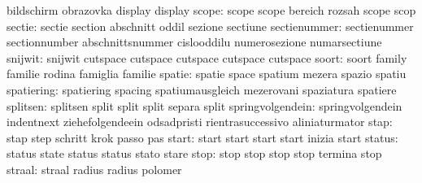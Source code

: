                            bildschirm                obrazovka
                           display                   display %
                    scope: scope                     scope
                           bereich                   rozsah
                           scope                     scop %
                   sectie: sectie                    section
                           abschnitt                 oddil
                           sezione                   sectiune
             sectienummer: sectienummer              sectionnumber
                           abschnittsnummer          cislooddilu
                           numerosezione             numarsectiune
                  snijwit: snijwit                   cutspace
                           cutspace                  cutspace
                           cutspace                  cutspace %
                    soort: soort                     family
                           familie                   rodina
                           famiglia                  familie
                   spatie: spatie                    space
                           spatium                   mezera
                           spazio                    spatiu
               spatiering: spatiering                spacing
                           spatiumausgleich          mezerovani
                           spaziatura                spatiere
                 splitsen: splitsen                  split
                           split                     split
                           separa                    split %
         springvolgendein: springvolgendein          indentnext
                           ziehefolgendeein          odsadpristi
                           rientrasuccessivo         aliniaturmator
                     stap: stap                      step
                           schritt                   krok
                           passo                     pas
                    start: start                     start
                           start                     start
                           inizia                    start
                   status: status                    state
                           status                    status
                           stato                     stare
                     stop: stop                      stop
                           stop                      stop
                           termina                   stop
                   straal: straal                    radius
                           radius                    polomer
